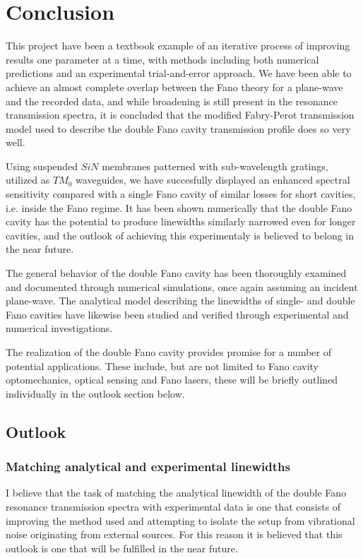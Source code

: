 \section{Conclusion}

This project have been a textbook example of an iterative process of improving results one parameter at a time, with methods including both numerical predictions and an experimental trial-and-error approach. We have been able to achieve an almost complete overlap between the Fano theory for a plane-wave and the recorded data, and while broadening is still present in the resonance transmission spectra, it is concluded that the modified Fabry-Perot transmission model used to describe the double Fano cavity transmission profile does so very well.

Using suspended $SiN$ membranes patterned with sub-wavelength gratings, utilized as $TM_0$ waveguides, we have succesfully displayed an enhanced spectral sensitivity compared with a single Fano cavity of similar losses for short cavities, i.e. inside the Fano regime. It has been shown numerically that the double Fano cavity has the potential to produce linewidths similarly narrowed even for longer cavities, and the outlook of achieving this experimentaly is believed to belong in the near future. 

The general behavior of the double Fano cavity has been thoroughly examined and documented through numerical simulations, once again assuming an incident plane-wave. The analytical model describing the linewidths of single- and double Fano cavities have likewise been studied and verified through experimental and numerical investigations. 

The realization of the double Fano cavity provides promise for a number of potential applications. These include, but are not limited to Fano cavity optomechanics, optical sensing and Fano lasers, these will be briefly outlined individually in the outlook section below. 

\subsection{Outlook}

\subsubsection{Matching analytical and experimental linewidths}

I believe that the task of matching the analytical linewidth of the double Fano resonance transmission spectra with experimental data is one that consists of improving the method used and attempting to isolate the setup from vibrational noise originating from external sources. For this reason it is believed that this outlook is one that will be fulfilled in the near future. 

